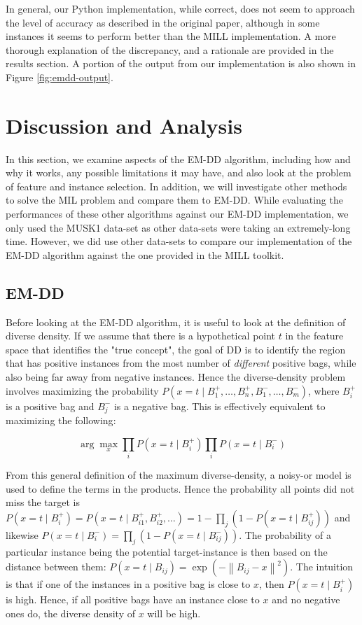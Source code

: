 \documentclass[conference]{IEEEtran}
\begin{document}
In general, our Python implementation, while correct, does not seem to approach the level of accuracy as described in the original paper, although in some instances it seems to perform better than the MILL implementation. A more thorough explanation of the discrepancy, and a rationale are provided in the results section. A portion of the output from our implementation is also shown in Figure \ref{fig:emdd-output}.

\section{Discussion and Analysis}

In this section, we examine aspects of the EM-DD algorithm, including how and why it works, any possible limitations it may have, and also look at the problem of feature and instance selection. In addition, we will investigate other methods to solve the MIL problem and compare them to EM-DD. While evaluating the performances of these other algorithms against our EM-DD implementation, we only used the MUSK1 data-set as other data-sets were taking an extremely-long time. However, we did use other data-sets to compare our implementation of the EM-DD algorithm against the one provided in the MILL toolkit.

\subsection{EM-DD}

Before looking at the EM-DD algorithm, it is useful to look at the definition of diverse density. If we assume that there is a hypothetical point $t$ in the feature space that identifies the "true concept", the goal of DD is to identify the region that has positive instances from the most number of \textit{different} positive bags, while also being far away from negative instances. Hence the diverse-density problem involves maximizing the probability $P(x = t \mid B_1^+, \dots, B_n^+, B_1^-, \dots, B_m^-)$, where $B_i^+$ is a positive bag and $B_j^-$ is a negative bag. This is effectively equivalent to maximizing the following\cite{maron1998framework}:

\begin{equation}
\arg\max_x \prod_i P(x = t \mid B_i^+) \prod_i P(x = t \mid B_i^-)
\end{equation}

From this general definition of the maximum diverse-density, a noisy-or model is used to define the terms in the products. Hence the probability all points did not miss the target is $P(x = t \mid B_i^+) = P(x = t \mid B^+_{i1}, B^+_{i2}, \dots) = 1 - \prod_j(1 - P(x =t \mid B^+_{ij}))$ and likewise $P(x = t \mid B_i^-) = \prod_j(1 - P(x = t \mid B_{ij}^-))$. The probability of a particular instance being the potential target-instance is then based on the distance between them: $P(x = t \mid B_{ij}) = \exp(- \left\| B_{ij} - x \right\|^2)$. The intuition is that if one of the instances in a positive bag is close to $x$, then $P(x = t \mid B_i^+)$ is high. Hence, if all positive bags have an instance close to $x$ and no negative ones do, the diverse density of $x$ will be high. 
\end{document}
